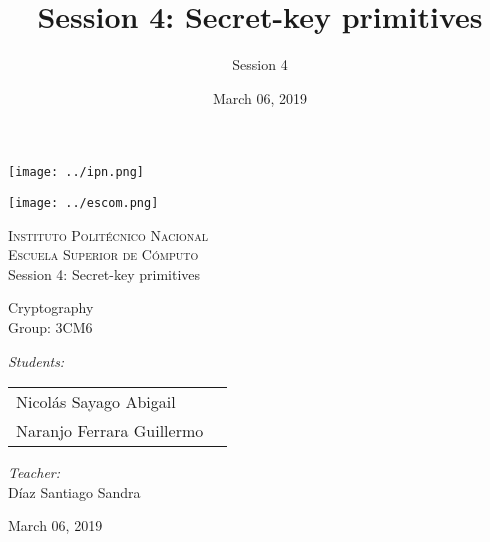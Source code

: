\documentclass[12pt]{article}
\date{March 06, 2019}
\title{Session 4: Secret-key primitives}
\author{Session 4}
\begin{document}
		\begin{titlepage}
			\begin{center}
				
				
				\noindent
				\begin{minipage}{0.5\textwidth}
					\begin{flushleft} \large
						\texttt{[image: ../ipn.png]}
					\end{flushleft}
				\end{minipage}%
				\begin{minipage}{0.55\textwidth}
					\begin{flushright} \large
						\texttt{[image: ../escom.png]}
					\end{flushright}
				\end{minipage}
				
				\textsc{\LARGE Instituto Politécnico Nacional}\\[0.5cm]
				
				\textsc{\Large Escuela Superior de Cómputo}\\[1cm]
				
				
				{ \huge Session 4: Secret-key primitives \\[1cm] }
				
				{ \Large Cryptography} \\[1cm]
				
				{ \Large Group: 3CM6 } \\[1cm]
				
				\noindent
				\begin{minipage}{0.5\textwidth}
					\begin{flushleft} \large
						\emph{Students:}\\
						
						\begin{tabular}{ll}
					     Nicolás Sayago Abigail\\
					     Naranjo Ferrara Guillermo\\
					     
					\end{tabular}
					\end{flushleft}
				\end{minipage}%
				\begin{minipage}{0.5\textwidth}
					\begin{flushright} \large
						\emph{Teacher:} \\
						Díaz Santiago Sandra  \\
					\end{flushright}
				\end{minipage}
				
				\vfill
				
				{\large March 06, 2019}
			\end{center}
		\end{titlepage}
	
\end{document}
